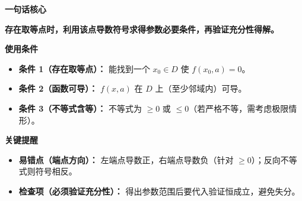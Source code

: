 \begin{summarybox}
	\textbf{\textcolor{CSummary}{一句话核心}}

	\textbf{存在取等点时，利用该点导数符号求得参数必要条件，再验证充分性得解。}

	\medskip
	\textbf{\textcolor{CSummary}{使用条件}}
	\begin{itemize}[leftmargin=*, itemsep=0.5em, topsep=0.4em]
		\item \textbf{条件 1（存在取等点）：} 能找到一个 $x_0\in D$ 使 $f(x_0,a)=0$。
		\item \textbf{条件 2（函数可导）：} $f(x,a)$ 在 $D$ 上（至少邻域内）可导。
		\item \textbf{条件 3（不等式含等）：} 不等式为 $\ge0$ 或 $\le0$（若严格不等，需考虑极限情形）。
	\end{itemize}

	\medskip
	\textbf{\textcolor{CSummary}{关键提醒}}
	\begin{itemize}[leftmargin=*, itemsep=0.5em, topsep=0.4em]
		\item \textbf{易错点（端点方向）：} 左端点导数正，右端点导数负（针对 $\ge0$）；反向不等式则符号相反。
		\item \textbf{检查项（必须验证充分性）：} 得出参数范围后要代入验证恒成立，避免失分。
	\end{itemize}
\end{summarybox}
